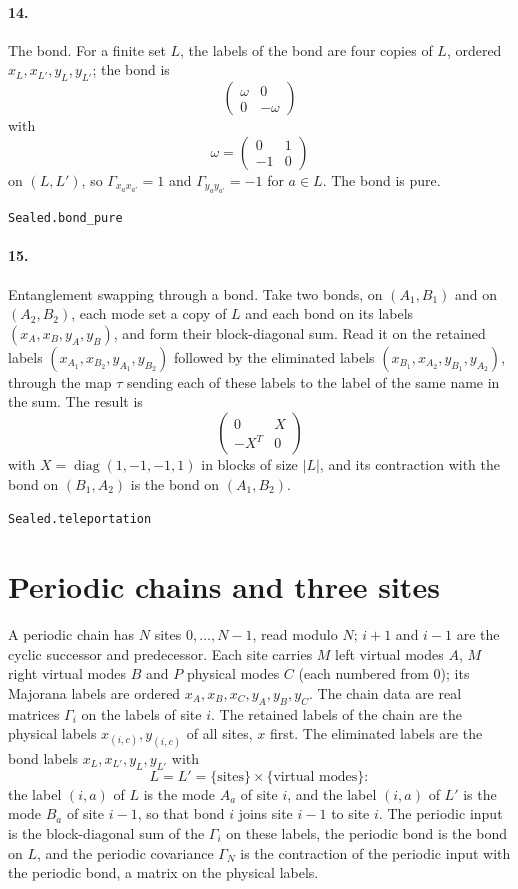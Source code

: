 \documentclass[11pt]{article}
\begin{document}
\paragraph{14.} The bond. For a finite set $L$, the labels of the bond are four copies of $L$, ordered $x_L, x_{L'}, y_L, y_{L'}$; the bond is \[\begin{pmatrix} \omega & 0 \\ 0 & -\omega \end{pmatrix}\] with \[\omega = \begin{pmatrix} 0 & 1 \\ -1 & 0 \end{pmatrix}\] on $(L, L')$, so $\Gamma_{x_a x_{a'}} = 1$ and $\Gamma_{y_a y_{a'}} = -1$ for $a \in L$. The bond is pure.\par{\footnotesize\texttt{Sealed.bond\_pure}}

\paragraph{15.} Entanglement swapping through a bond. Take two bonds, on $(A_1, B_1)$ and on $(A_2, B_2)$, each mode set a copy of $L$ and each bond on its labels $(x_A, x_B, y_A, y_B)$, and form their block-diagonal sum. Read it on the retained labels $(x_{A_1}, x_{B_2}, y_{A_1}, y_{B_2})$ followed by the eliminated labels $(x_{B_1}, x_{A_2}, y_{B_1}, y_{A_2})$, through the map $\tau$ sending each of these labels to the label of the same name in the sum. The result is \[\begin{pmatrix} 0 & X \\ -X^T & 0 \end{pmatrix}\] with $X = \operatorname{diag}(1, -1, -1, 1)$ in blocks of size $|L|$, and its contraction with the bond on $(B_1, A_2)$ is the bond on $(A_1, B_2)$.\par{\footnotesize\texttt{Sealed.teleportation}}

\section*{Periodic chains and three sites}
A periodic chain has $N$ sites $0, \dots, N - 1$, read modulo $N$; $i + 1$ and $i - 1$ are the cyclic successor and predecessor. Each site carries $M$ left virtual modes $A$, $M$ right virtual modes $B$ and $P$ physical modes $C$ (each numbered from $0$); its Majorana labels are ordered $x_A, x_B, x_C, y_A, y_B, y_C$. The chain data are real matrices $\Gamma_i$ on the labels of site $i$. The retained labels of the chain are the physical labels $x_{(i,c)}, y_{(i,c)}$ of all sites, $x$ first. The eliminated labels are the bond labels $x_L, x_{L'}, y_L, y_{L'}$ with \[L = L' = \{\text{sites}\} \times \{\text{virtual modes}\}:\] the label $(i, a)$ of $L$ is the mode $A_a$ of site $i$, and the label $(i, a)$ of $L'$ is the mode $B_a$ of site $i - 1$, so that bond $i$ joins site $i - 1$ to site $i$. The periodic input is the block-diagonal sum of the $\Gamma_i$ on these labels, the periodic bond is the bond on $L$, and the periodic covariance $\Gamma_N$ is the contraction of the periodic input with the periodic bond, a matrix on the physical labels.
\end{document}
